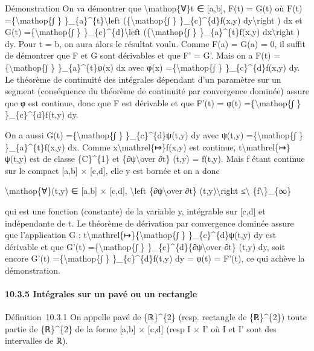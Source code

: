 \documentclass[]{article}
\begin{document}
Démonstration On va démontrer que \textbackslash{}mathop\{∀\}t ∈
{[}a,b{]}, F(t) = G(t) où F(t) =\{\textbackslash{}mathop\{∫ \}
\}\_\{a\}\^{}\{t\}\textbackslash{}left (\{\textbackslash{}mathop\{∫ \}
\}\_\{c\}\^{}\{d\}f(x,y) dy\textbackslash{}right ) dx et G(t)
=\{\textbackslash{}mathop\{∫ \} \}\_\{c\}\^{}\{d\}\textbackslash{}left
(\{\textbackslash{}mathop\{∫ \} \}\_\{a\}\^{}\{t\}f(x,y)
dx\textbackslash{}right ) dy. Pour t = b, on aura alors le résultat
voulu. Comme F(a) = G(a) = 0, il suffit de démontrer que F et G sont
dérivables et que F' = G'. Mais on a F(t) =\{\textbackslash{}mathop\{∫
\} \}\_\{a\}\^{}\{t\}φ(x) dx avec φ(x) =\{\textbackslash{}mathop\{∫ \}
\}\_\{c\}\^{}\{d\}f(x,y) dy. Le théorème de continuité des intégrales
dépendant d'un paramètre sur un segment (conséquence du théorème de
continuité par convergence dominée) assure que φ est continue, donc que
F est dérivable et que F'(t) = φ(t) =\{\textbackslash{}mathop\{∫ \}
\}\_\{c\}\^{}\{d\}f(t,y) dy.

On a aussi G(t) =\{\textbackslash{}mathop\{∫ \} \}\_\{c\}\^{}\{d\}ψ(t,y)
dy avec ψ(t,y) =\{\textbackslash{}mathop\{∫ \} \}\_\{a\}\^{}\{t\}f(x,y)
dx. Comme x\textbackslash{}mathrel\{↦\}f(x,y) est continue,
t\textbackslash{}mathrel\{↦\}ψ(t,y) est de classe \{C\}\^{}\{1\} et
\{∂ψ\textbackslash{}over ∂t\} (t,y) = f(t,y). Mais f étant continue sur
le compact {[}a,b{]} × {[}c,d{]}, elle y est bornée et on a donc

\textbackslash{}mathop\{∀\}(t,y) ∈ {[}a,b{]} × {[}c,d{]},
\textbackslash{}left \textbar{}\{∂ψ\textbackslash{}over ∂t\}
(t,y)\textbackslash{}right \textbar{}≤\textbackslash{}\textbar{}
\{f\textbackslash{}\textbar{}\}\_\{∞\}

qui est une fonction (constante) de la variable y, intégrable sur
{[}c,d{]} et indépendante de t. Le théorème de dérivation par
convergence dominée assure que l'application G :
t\textbackslash{}mathrel\{↦\}\{\textbackslash{}mathop\{∫ \}
\}\_\{c\}\^{}\{d\}ψ(t,y) dy est dérivable et que G'(t)
=\{\textbackslash{}mathop\{∫ \}
\}\_\{c\}\^{}\{d\}\{∂ψ\textbackslash{}over ∂t\} (t,y) dy, soit encore
G'(t) =\{\textbackslash{}mathop\{∫ \} \}\_\{c\}\^{}\{d\}f(t,y) dy = φ(t)
= F'(t), ce qui achève la démonstration.

\paragraph{10.3.5 Intégrales sur un pavé ou un rectangle}

Définition~10.3.1 On appelle pavé de \{ℝ\}\^{}\{2\} (resp. rectangle de
\{ℝ\}\^{}\{2\}) toute partie de \{ℝ\}\^{}\{2\} de la forme {[}a,b{]} ×
{[}c,d{]} (resp I × I' où I et I' sont des intervalles de ℝ).
\end{document}
